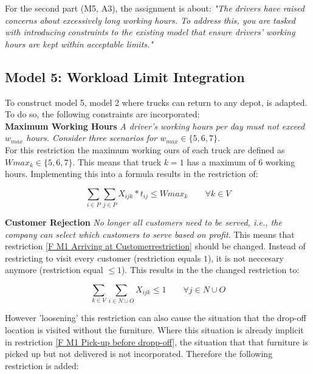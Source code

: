 
For the second part (M5, A3), the assignment is about: \textit{"The drivers have raised concerns about excessively long working hours. To address this, you are tasked with introducing constraints to the existing model that ensure drivers’ working hours are kept within acceptable limits." }

\vspace{0.5cm}
\subsection{Model 5: Workload Limit Integration}
To construct model 5, model 2 where trucks can return to any depot, is adapted. To do so, the following constraints are incorporated:\\

\textbf{Maximum Working Hours} \textit{A driver’s working hours per day must not exceed $w_{max}$ hours. Consider three scenarios for $w_{max} \in \{ 5, 6, 7 \}.$} \\
For this restriction the maximum working ours of each truck are defined as $Wmax_{k} \in \{5, 6, 7\}$. This means that truck $k=1$ has a maximum of $6$ working hours. Implementing this into a formula results in the restriction of:

\begin{equation} 
\sum_{i\in P} \sum_{j \in P} X_{ijk} * t_{ij} \leq Wmax_{k}    \qquad   \forall k \in V
\label{F m5 maximum working hours}
\end{equation}

\textbf{Customer Rejection} \textit{No longer all customers need to be served, i.e., the company can select which customers to serve based on profit}. This means that restriction \ref{F M1 Arriving at Customerrestriction} should be changed. Instead of restricting to visit every customer (restriction equals $1$), it is not neccesary anymore (restriction equal $\leq 1$). This results in the the changed restriction to:

\begin{equation} 
\sum_{k\in V}\sum_{i\in N \cup O} X_{ijk} \leq 1 \qquad   \forall j\in N \cup O
\label{F m5 Arriving at Customer restriction}
\end{equation}

However 'loosening' this restriction can also cause the situation that the drop-off location is visited without the furniture. Where this situation is already implicit in restriction \ref{F M1 Pick-up before dropp-off}, the situation that that furniture is picked up but not delivered is not incorporated. Therefore the following restriction is added:

